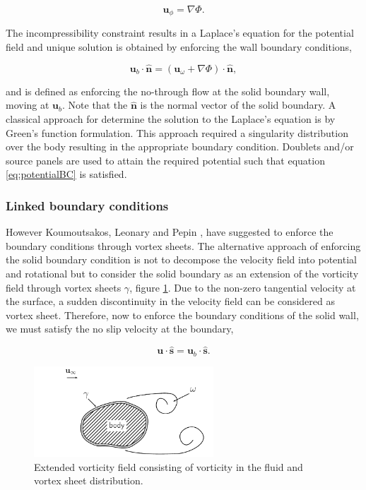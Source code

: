 	\begin{equation}
	\mathbf{u}_{\phi} = \nabla\Phi.
	\end{equation}

The incompressibility constraint results in a Laplace's equation for the potential field and unique solution is obtained by enforcing the wall boundary conditions,

	\begin{equation}
	\mathbf{u}_b\cdot\mathbf{\hat{n}} = \left(\mathbf{u}_{\omega} + \nabla\Phi\right) \cdot \mathbf{\hat{n}},
	\label{eq:potentialBC}
	\end{equation}

and is defined as enforcing the no-through flow at the solid boundary wall, moving at $\mathbf{u}_b$. Note that the $\mathbf{\hat{n}}$ is the normal vector of the solid boundary. A classical approach for determine the solution to the Laplace's equation is by Green's function formulation. This approach required a singularity distribution over the body resulting in the appropriate boundary condition. Doublets and/or source panels are used to attain the required potential such that equation \ref{eq:potentialBC} is satisfied.

\subsubsection{Linked boundary conditions}

However Koumoutsakos, Leonary and Pepin \cite{Koumoutsakos1994b}, have suggested to enforce the boundary conditions through vortex sheets. The alternative approach of enforcing the solid boundary condition is not to decompose the velocity field into potential and rotational but to consider the solid boundary as an extension of the vorticity field through vortex sheets $\gamma$, figure \ref{fig:noSlipVorticityField}. Due to the non-zero tangential velocity at the surface, a sudden discontinuity in the velocity field can be considered as vortex sheet. Therefore, now to enforce the boundary conditions of the solid wall, we must satisfy the no slip velocity at the boundary,

	\begin{equation}
	\mathbf{u}\cdot\mathbf{\hat{s}} = \mathbf{u}_b\cdot\mathbf{\hat{s}}.
	\end{equation}

	\begin{figure}[t]
	\centering
	\includegraphics[width=0.6\textwidth]{figures/lagrangian/noSlipVorticityField.pdf}
	\caption{Extended vorticity field consisting of vorticity in the fluid and vortex sheet distribution.}
	\label{fig:noSlipVorticityField}
	\end{figure}

